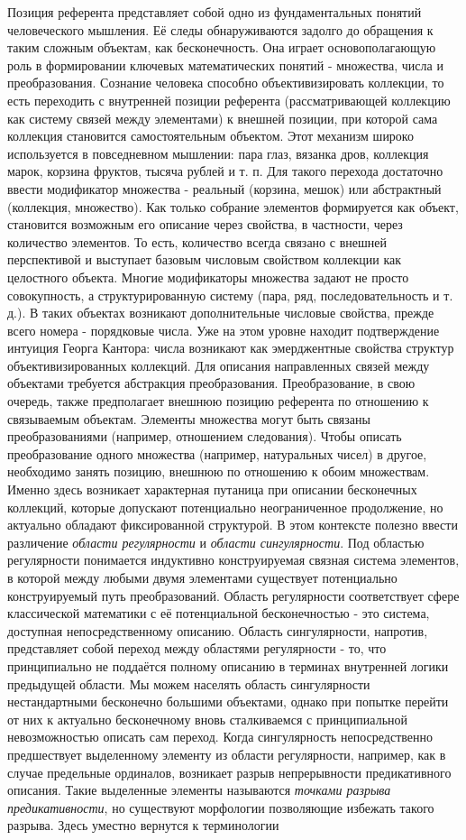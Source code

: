 \documentclass[12pt]{article}
\begin{document}
Позиция референта представляет собой одно из фундаментальных понятий человеческого мышления. Её следы обнаруживаются задолго до обращения к таким сложным объектам, как бесконечность. Она играет основополагающую роль в формировании ключевых математических понятий - множества, числа и преобразования. Сознание человека способно объективизировать коллекции, то есть переходить с внутренней позиции референта (рассматривающей коллекцию как систему связей между элементами) к внешней позиции, при которой сама коллекция становится самостоятельным объектом. Этот механизм широко используется в повседневном мышлении: пара глаз, вязанка дров, коллекция марок, корзина фруктов, тысяча рублей и т. п. Для такого перехода достаточно ввести модификатор множества - реальный (корзина, мешок) или абстрактный (коллекция, множество). Как только собрание элементов формируется как объект, становится возможным его описание через свойства, в частности, через количество элементов. То есть, количество всегда связано с внешней перспективой и выступает базовым числовым свойством коллекции как целостного объекта. Многие модификаторы множества задают не просто совокупность, а структурированную систему (пара, ряд, последовательность и т. д.). В таких объектах возникают дополнительные числовые свойства, прежде всего номера - порядковые числа. Уже на этом уровне находит подтверждение интуиция Георга Кантора: числа возникают как эмерджентные свойства структур объективизированных коллекций. Для описания направленных связей между объектами требуется абстракция преобразования. Преобразование, в свою очередь, также предполагает внешнюю позицию референта по отношению к связываемым объектам. Элементы множества могут быть связаны преобразованиями (например, отношением следования). Чтобы описать преобразование одного множества (например, натуральных чисел) в другое, необходимо занять позицию, внешнюю по отношению к обоим множествам. Именно здесь возникает характерная путаница при описании бесконечных коллекций, которые допускают потенциально неограниченное продолжение, но актуально обладают фиксированной структурой. В этом контексте полезно ввести различение {\it области регулярности} и {\it области сингулярности}. Под областью регулярности понимается индуктивно конструируемая связная система элементов, в которой между любыми двумя элементами существует потенциально конструируемый путь преобразований. Область регулярности соответствует сфере классической математики с её потенциальной бесконечностью - это система, доступная непосредственному описанию. Область сингулярности, напротив, представляет собой переход между областями регулярности - то, что принципиально не поддаётся полному описанию в терминах внутренней логики предыдущей области. Мы можем населять область сингулярности нестандартными бесконечно большими объектами, однако при попытке перейти от них к актуально бесконечному вновь сталкиваемся с принципиальной невозможностью описать сам переход. Когда сингулярность непосредственно предшествует выделенному элементу из области регулярности, например, как в случае предельные ординалов, возникает разрыв непрерывности предикативного описания. Такие выделенные элементы называются {\it точками разрыва предикативности}, но существуют морфологии позволяющие избежать такого разрыва. Здесь уместно вернутся к терминологии 
\end{document}
